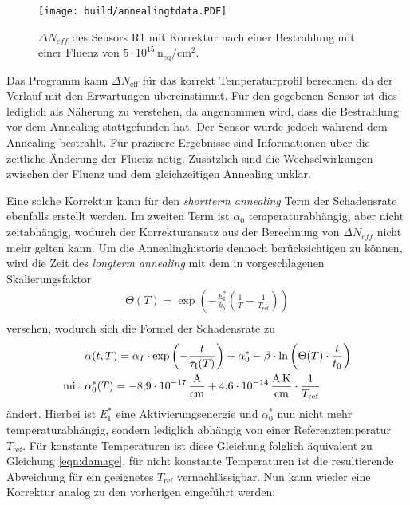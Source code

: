 \begin{figure}[!htb]
  \centering
    \texttt{[image: build/annealingtdata.PDF]}
\caption{$\Delta N_{eff}$ des Sensors R1 mit Korrektur nach einer Bestrahlung mit einer Fluenz von $5\cdot 10^{15} \, \mathrm{n_{eq}/cm^2}$.}
\label{fig:korrektur_N_eff}
\end{figure}



Das Programm kann $\Delta N_{\mathrm{eff}}$ für das korrekt
Temperaturprofil berechnen, da der Verlauf mit den Erwartungen übereinstimmt.
Für den gegebenen Sensor ist dies lediglich als Näherung zu verstehen, da angenommen
wird, dass die Bestrahlung vor dem Annealing stattgefunden hat. Der Sensor wurde jedoch
während dem Annealing bestrahlt.
Für präzisere Ergebnisse sind Informationen über die zeitliche Änderung der Fluenz nötig.
Zusätzlich sind die Wechselwirkungen zwischen der Fluenz und dem gleichzeitigen Annealing unklar.



Eine solche Korrektur
kann für den \textit{shortterm annealing} Term der Schadensrate ebenfalls erstellt werden.
Im zweiten Term ist $\alpha_{0}$ temperaturabhängig, aber nicht zeitabhängig,
wodurch der Korrekturansatz aus der Berechnung von $\Delta N_{eff}$ nicht mehr gelten kann. Um die Annealinghistorie dennoch
berücksichtigen zu können, wird die Zeit des \textit{longterm annealing} mit dem in \cite{moll} vorgeschlagenen
Skalierungsfaktor
\begin{align}
  \Theta(T) =  \exp{\left(-\frac{E_{\mathrm{I}}^*}{k_b}\left(\frac{1}{T}-\frac{1}{T_{\mathrm{ref}}}\right)\right)} \\
\end{align}
versehen, wodurch sich die Formel der Schadensrate  zu
\begin{align}
  &\alpha(t, T) = \alpha_I \cdot \exp{\left(-\frac{t}{\tau_{\mathrm{I}}(T)}\right)} + \alpha_{\mathrm{0}}^{*} -\beta \cdot \ln{\left(\Theta(T) \cdot \frac{t}{t_{\mathrm{0}}}\right)} \\
  \medskip
  \text{mit}\:\: &\alpha^*_{\mathrm{0}}(T) = \SI{-8.9e-17}{\ampere\per\centi\meter} + \SI{4.6e-14}{\ampere\kelvin\per\centi\meter} \cdot \frac{1}{T_{\mathrm{ref}}}
\end{align}
ändert.
Hierbei ist $E_{\mathrm{I}}^*$ eine Aktivierungsenergie und $\alpha^*_{0}$ nun nicht mehr temperaturabhängig,
sondern lediglich abhängig von einer Referenztemperatur $T_{\mathrm{ref}}$. Für konstante Temperaturen
ist diese Gleichung folglich äquivalent zu Gleichung \ref{eqn:damage}, für nicht
konstante Temperaturen ist die resultierende Abweichung für ein geeignetes $T_{\mathrm{ref}}$ vernachlässigbar.
Nun kann wieder eine Korrektur analog zu den vorherigen eingeführt werden:

